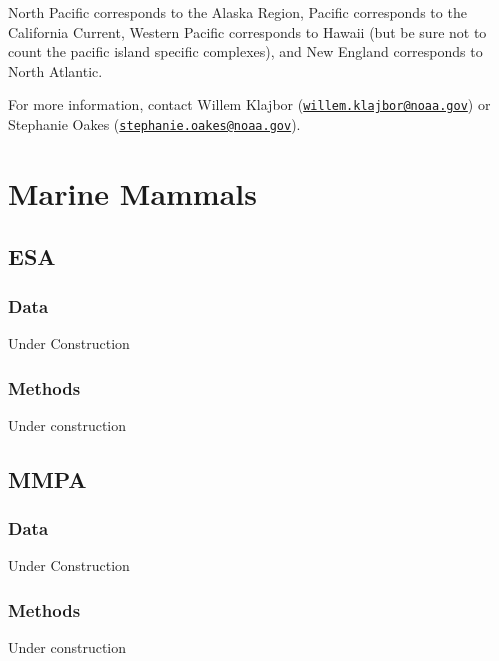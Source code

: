 \documentclass[
]{book}
\begin{document}
North Pacific corresponds to the Alaska Region, Pacific corresponds to the California Current, Western Pacific corresponds to Hawaii (but be sure not to count the pacific island specific complexes), and New England corresponds to North Atlantic.

For more information, contact Willem Klajbor (\href{mailto:willem.klajbor@noaa.gov}{\nolinkurl{willem.klajbor@noaa.gov}}) or Stephanie Oakes (\href{mailto:stephanie.oakes@noaa.gov}{\nolinkurl{stephanie.oakes@noaa.gov}}).

\hypertarget{marine-mammals}{%
\chapter{Marine Mammals}\label{marine-mammals}}

\hypertarget{esa}{%
\section{ESA}\label{esa}}

\hypertarget{data-6}{%
\subsection{Data}\label{data-6}}

Under Construction

\hypertarget{methods-6}{%
\subsection{Methods}\label{methods-6}}

Under construction

\hypertarget{mmpa}{%
\section{MMPA}\label{mmpa}}

\hypertarget{data-7}{%
\subsection{Data}\label{data-7}}

Under Construction

\hypertarget{methods-7}{%
\subsection{Methods}\label{methods-7}}

Under construction
\end{document}
